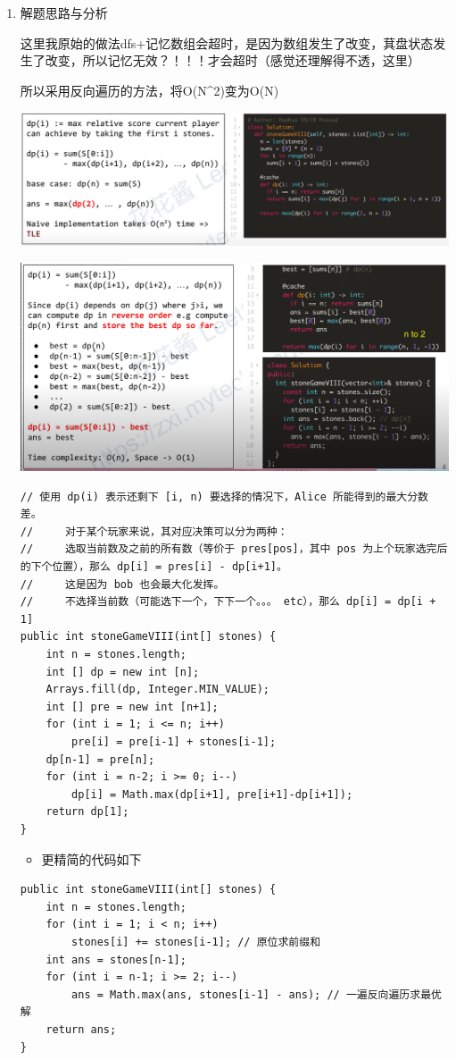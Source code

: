 \documentclass[9pt, b5paaper]{book}
\begin{document}
\begin{enumerate}
\item 解题思路与分析
\label{sec-1-1-4-1}

这里我原始的做法dfs+记忆数组会超时，是因为数组发生了改变，萁盘状态发生了改变，所以记忆无效？！！！才会超时（感觉还理解得不透，这里）

所以采用反向遍历的方法，将O(N\^{}2)变为O(N)

\includegraphics[width=.9\linewidth]{./pic/stone8.png}

\includegraphics[width=.9\linewidth]{./pic/stone82.png}


\begin{verbatim}
// 使用 dp(i) 表示还剩下 [i, n) 要选择的情况下，Alice 所能得到的最大分数差。
//     对于某个玩家来说，其对应决策可以分为两种：
//     选取当前数及之前的所有数（等价于 pres[pos]，其中 pos 为上个玩家选完后的下个位置），那么 dp[i] = pres[i] - dp[i+1]。
//     这是因为 bob 也会最大化发挥。
//     不选择当前数（可能选下一个，下下一个。。。 etc），那么 dp[i] = dp[i + 1]
public int stoneGameVIII(int[] stones) {
    int n = stones.length;
    int [] dp = new int [n];
    Arrays.fill(dp, Integer.MIN_VALUE);
    int [] pre = new int [n+1];
    for (int i = 1; i <= n; i++)
        pre[i] = pre[i-1] + stones[i-1];
    dp[n-1] = pre[n];
    for (int i = n-2; i >= 0; i--) 
        dp[i] = Math.max(dp[i+1], pre[i+1]-dp[i+1]);
    return dp[1];
}
\end{verbatim}
\begin{itemize}
\item 更精简的代码如下
\end{itemize}
\begin{verbatim}
public int stoneGameVIII(int[] stones) {
    int n = stones.length;
    for (int i = 1; i < n; i++) 
        stones[i] += stones[i-1]; // 原位求前缀和
    int ans = stones[n-1];
    for (int i = n-1; i >= 2; i--) 
        ans = Math.max(ans, stones[i-1] - ans); // 一遍反向遍历求最优解
    return ans;
}
\end{verbatim}
\end{enumerate}
\end{document}
